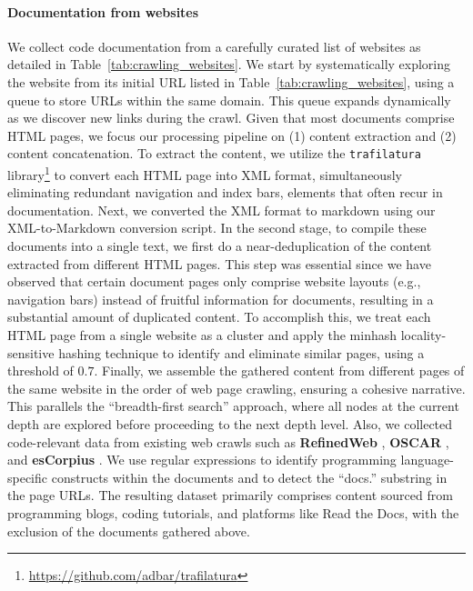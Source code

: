 \documentclass[10pt]{article} %
\begin{document}
\paragraph{Documentation from websites} We collect code documentation from a carefully curated list of websites as detailed in Table~\ref{tab:crawling_websites}.
We start by systematically exploring the website from its initial URL listed in Table~\ref{tab:crawling_websites}, using a queue to store URLs within the same domain. This queue expands dynamically as we discover new links during the crawl.
Given that most documents comprise HTML pages, we focus our processing pipeline on (1) content extraction and (2) content concatenation. To extract the content, we utilize the \verb|trafilatura| library\footnote{\url{https://github.com/adbar/trafilatura}} to convert each HTML page into XML format, simultaneously eliminating redundant navigation and index bars, elements that often recur in documentation. Next, we converted the XML format to markdown using our XML-to-Markdown conversion script. 
In the second stage, to compile these documents into a single text, we first do a near-deduplication of the content extracted from different HTML pages.
This step was essential since we have observed that certain document pages only comprise website layouts (e.g., navigation bars) instead of fruitful information for documents, resulting in a substantial amount of duplicated content.
To accomplish this, we treat each HTML page from a single website as a cluster and apply the minhash locality-sensitive hashing technique to identify and eliminate similar pages, using a threshold of $0.7$.
Finally, we assemble the gathered content from different pages of the same website in the order of web page crawling, ensuring a cohesive narrative.
This parallels the ``breadth-first search'' approach, where all nodes at the current depth are explored before proceeding to the next depth level.
Also, we collected code-relevant data from existing web crawls such as \textbf{RefinedWeb} \citep{penedo2023refinedweb}, \textbf{OSCAR} \citep{OSCAR2019}, and \textbf{esCorpius} \citep{gutiérrezfandiño2022escorpius}. We use regular expressions to identify programming language-specific constructs within the documents and to detect the ``docs.'' substring in the page URLs.
The resulting dataset primarily comprises content sourced from programming blogs, coding tutorials, and platforms like Read the Docs, with the exclusion of the documents gathered above.
\end{document}
